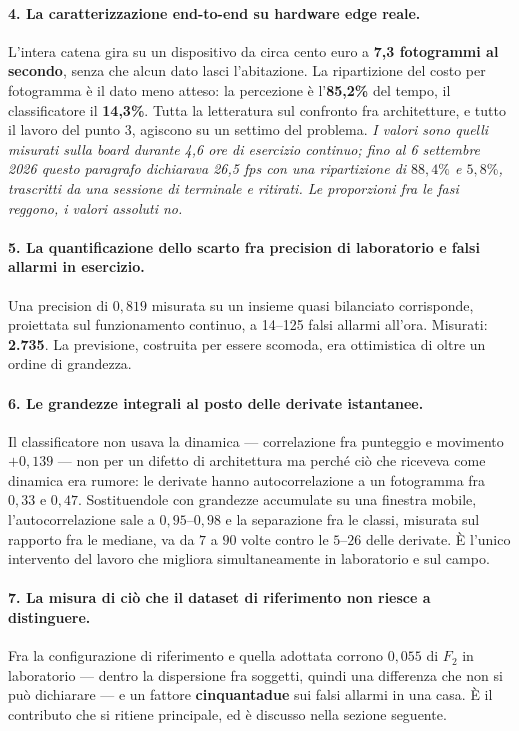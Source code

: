 \paragraph{4. La caratterizzazione end-to-end su hardware edge reale.} L'intera catena gira su un dispositivo da circa cento euro a \textbf{7,3 fotogrammi al secondo}, senza che alcun dato lasci l'abitazione. La ripartizione del costo per fotogramma è il dato meno atteso: la percezione è l'\textbf{85,2\%} del tempo, il classificatore il \textbf{14,3\%}. Tutta la letteratura sul confronto fra architetture, e tutto il lavoro del punto 3, agiscono su un settimo del problema. \emph{I valori sono quelli misurati sulla board durante 4,6 ore di esercizio continuo; fino al 6 settembre 2026 questo paragrafo dichiarava 26,5 fps con una ripartizione di $88{,}4\%$ e $5{,}8\%$, trascritti da una sessione di terminale e ritirati. Le proporzioni fra le fasi reggono, i valori assoluti no.}

\paragraph{5. La quantificazione dello scarto fra precision di laboratorio e falsi allarmi in esercizio.} Una precision di $0{,}819$ misurata su un insieme quasi bilanciato corrisponde, proiettata sul funzionamento continuo, a 14--125 falsi allarmi all'ora. Misurati: \textbf{2.735}. La previsione, costruita per essere scomoda, era ottimistica di oltre un ordine di grandezza.

\paragraph{6. Le grandezze integrali al posto delle derivate istantanee.} Il classificatore non usava la dinamica --- correlazione fra punteggio e movimento $+0{,}139$ --- non per un difetto di architettura ma perché ciò che riceveva come dinamica era rumore: le derivate hanno autocorrelazione a un fotogramma fra $0{,}33$ e $0{,}47$. Sostituendole con grandezze accumulate su una finestra mobile, l'autocorrelazione sale a $0{,}95$--$0{,}98$ e la separazione fra le classi, misurata sul rapporto fra le mediane, va da $7$ a $90$ volte contro le $5$--$26$ delle derivate. È l'unico intervento del lavoro che migliora simultaneamente in laboratorio e sul campo.

\paragraph{7. La misura di ciò che il dataset di riferimento non riesce a distinguere.} Fra la configurazione di riferimento e quella adottata corrono $0{,}055$ di $F_2$ in laboratorio --- dentro la dispersione fra soggetti, quindi una differenza che non si può dichiarare --- e un fattore \textbf{cinquantadue} sui falsi allarmi in una casa. È il contributo che si ritiene principale, ed è discusso nella sezione seguente.

